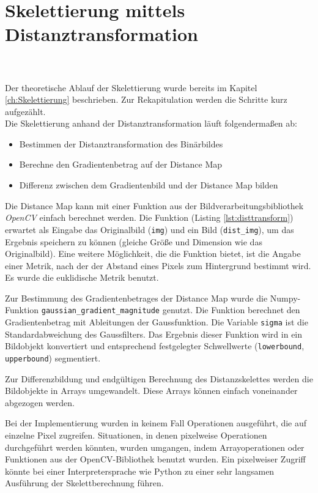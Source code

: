 \section{Skelettierung mittels Distanztransformation}
\\\\
Der theoretische Ablauf der Skelettierung wurde bereits im Kapitel \ref{ch:Skelettierung} beschrieben. Zur
Rekapitulation werden die Schritte kurz aufgezählt. \\
Die Skelettierung anhand der Distanztransformation läuft folgendermaßen ab:
\begin{itemize}
\item Bestimmen der Distanztransformation des Binärbildes
\item Berechne den Gradientenbetrag auf der Distance Map
\item Differenz zwischen dem Gradientenbild und der Distance Map bilden
\end{itemize}
Die Distance Map kann mit einer Funktion aus der Bildverarbeitungsbibliothek \emph{OpenCV} einfach berechnet
werden. Die Funktion (Listing \ref{lst:disttransform}) erwartet als Eingabe das Originalbild (\texttt{img}) und ein Bild (\texttt{dist\_img}), um
das Ergebnis speichern zu können (gleiche Größe und Dimension wie das Originalbild). Eine weitere Möglichkeit, die die Funktion bietet, ist die Angabe einer Metrik, nach der der Abstand eines Pixels zum
Hintergrund bestimmt wird. Es wurde die euklidische Metrik benutzt.

Zur Bestimmung des Gradientenbetrages der Distance Map wurde die Numpy-Funktion \texttt{gaussian\_gradient\_magnitude} genutzt. Die Funktion berechnet den Gradientenbetrag mit Ableitungen
der Gaussfunktion. Die Variable \texttt{sigma} ist die Standardabweichung 
des Gaussfilters. Das Ergebnis dieser Funktion wird in ein Bildobjekt
konvertiert und entsprechend festgelegter Schwellwerte (\texttt{lowerbound}, \texttt{upperbound}) segmentiert.

Zur Differenzbildung und endgültigen Berechnung des Distanzskelettes werden die Bildobjekte in Arrays umgewandelt. 
Diese Arrays können einfach voneinander abgezogen werden. 

Bei der Implementierung wurden in keinem Fall Operationen ausgeführt, die auf einzelne Pixel zugreifen. Situationen, in denen
pixelweise Operationen durchgeführt werden könnten, wurden
umgangen, indem Arrayoperationen oder Funktionen aus der
OpenCV-Bibliothek benutzt wurden. Ein pixelweiser Zugriff
könnte bei einer Interpretersprache wie Python zu einer sehr langsamen
Ausführung der Skelettberechnung führen.